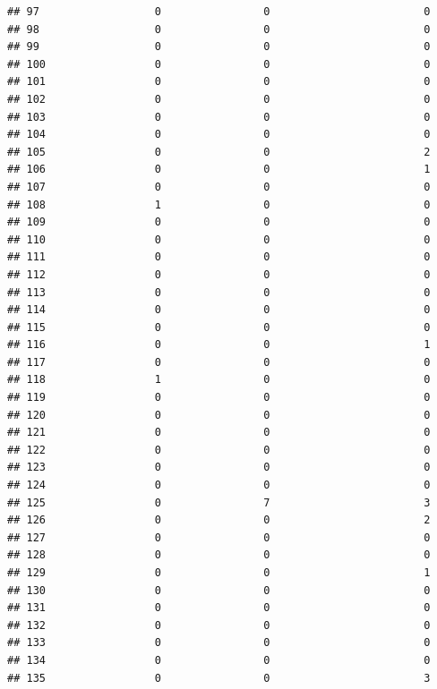 \documentclass[
]{article}
\begin{document}
\begin{verbatim}
## 97                  0                0                        0
## 98                  0                0                        0
## 99                  0                0                        0
## 100                 0                0                        0
## 101                 0                0                        0
## 102                 0                0                        0
## 103                 0                0                        0
## 104                 0                0                        0
## 105                 0                0                        2
## 106                 0                0                        1
## 107                 0                0                        0
## 108                 1                0                        0
## 109                 0                0                        0
## 110                 0                0                        0
## 111                 0                0                        0
## 112                 0                0                        0
## 113                 0                0                        0
## 114                 0                0                        0
## 115                 0                0                        0
## 116                 0                0                        1
## 117                 0                0                        0
## 118                 1                0                        0
## 119                 0                0                        0
## 120                 0                0                        0
## 121                 0                0                        0
## 122                 0                0                        0
## 123                 0                0                        0
## 124                 0                0                        0
## 125                 0                7                        3
## 126                 0                0                        2
## 127                 0                0                        0
## 128                 0                0                        0
## 129                 0                0                        1
## 130                 0                0                        0
## 131                 0                0                        0
## 132                 0                0                        0
## 133                 0                0                        0
## 134                 0                0                        0
## 135                 0                0                        3

\end{verbatim}
\end{document}
